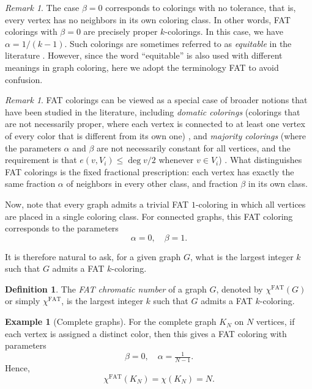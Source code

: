 \documentclass{article}
\theoremstyle{plain}
\theoremstyle{definition}
\newtheorem{definition}[theorem]{Definition}
\newtheorem{example}[theorem]{Example}
\theoremstyle{remark}
\newtheorem{remark}[theorem]{Remark}
\begin{document}
\begin{remark}\label{rmk:proper}
The case $\beta=0$ corresponds to colorings with no tolerance, that is, every vertex has no neighbors in its own coloring class. In other words, FAT colorings with $\beta=0$ are precisely proper $k$-colorings. In this case, we have $\alpha=1/(k-1)$. Such colorings are sometimes referred to as \emph{equitable} in the literature \cite{beersmulas2024}. However, since the word ``equitable'' is also used with different meanings in graph coloring, here we adopt the terminology FAT to avoid confusion.
\end{remark}

\begin{remark}
FAT colorings can be viewed as a special case of broader notions that have been studied in the literature, including \emph{domatic colorings} (colorings that are not necessarily proper, where each vertex is connected to at least one vertex of every color that is different from its own one) \cite{zelinka1981domatic}, and \emph{majority colorings} (where the parameters $\alpha$ and $\beta$ are not necessarily constant for all vertices, and the requirement is that $e(v,V_i)\leq \deg v/2$ whenever $v\in V_i$) \cite{bosek2019majority}. What distinguishes FAT colorings is the fixed fractional prescription: each vertex has exactly the same fraction $\alpha$ of neighbors in every other class, and fraction $\beta$ in its own class. 
\end{remark}



Now, note that every graph admits a trivial FAT $1$-coloring in which all vertices are placed in a single coloring class. For connected graphs, this FAT coloring corresponds to the parameters 
$$
\alpha = 0, \quad \beta = 1.
$$

It is therefore natural to ask, for a given graph $G$, what is the largest integer $k$ such that $G$ admits a FAT $k$-coloring. 

\begin{definition}
    The  \emph{FAT chromatic number} of a graph $G$, denoted by $\chi^{\textrm{FAT}}(G)$ or simply $\chi^{\textrm{FAT}}$, is the largest integer $k$ such that  $G$ admits a FAT $k$-coloring. 
\end{definition}

\begin{example}[Complete graphs]\label{ex:KN}
    For the complete graph $K_N$ on $N$ vertices, if each vertex is assigned a distinct color, then this gives a FAT coloring with parameters
$$
\beta = 0, \quad \alpha = \tfrac{1}{N-1}.
$$
Hence,
$$
\chi^{\mathrm{FAT}}(K_N) = \chi(K_N) = N.
$$
\end{example}
\end{document}
